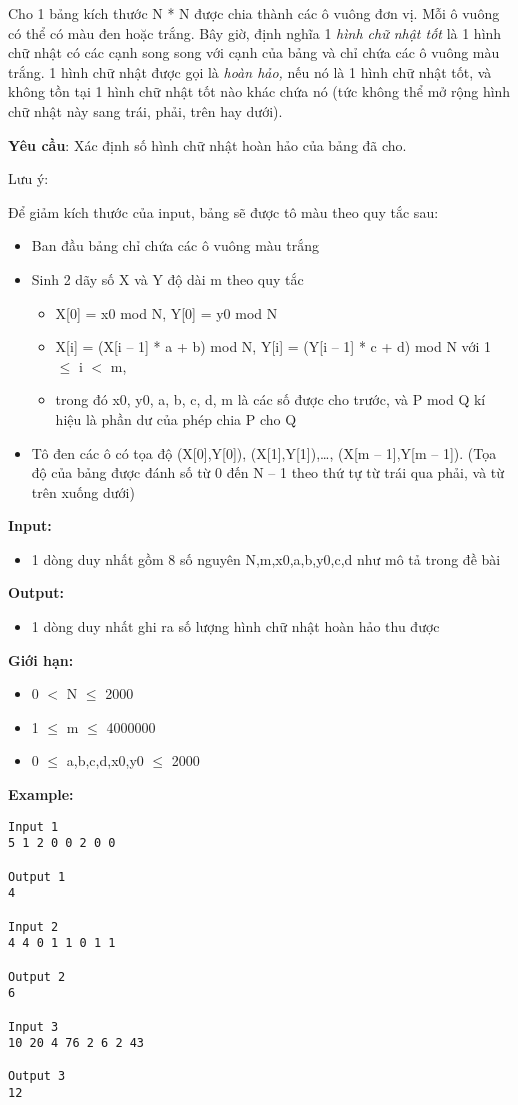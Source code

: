 

Cho 1 bảng kích thước N * N được chia thành các ô vuông đơn vị. Mỗi ô vuông có thể có màu đen hoặc trắng. Bây giờ, định nghĩa 1 \emph{ hình chữ nhật tốt } là 1 hình chữ nhật có các cạnh song song với cạnh của bảng và chỉ chứa các ô vuông màu trắng. 1 hình chữ nhật được gọi là \emph{ hoàn hảo, } nếu nó là 1 hình chữ nhật tốt, và không tồn tại 1 hình chữ nhật tốt nào khác chứa nó (tức không thể mở rộng hình chữ nhật này sang trái, phải, trên hay dưới).

\textbf{Yêu cầu}: Xác định số hình chữ nhật hoàn hảo của bảng đã cho.

Lưu ý:

Để giảm kích thước của input, bảng sẽ được tô màu theo quy tắc sau:
\begin{itemize}
	\item Ban đầu bảng chỉ chứa các ô vuông màu trắng
	\item Sinh 2 dãy số X và Y độ dài m theo quy tắc
\begin{itemize}
	\item X[0] = x0 mod N, Y[0] = y0 mod N
	\item X[i] = (X[i – 1] * a + b) mod N, Y[i] = (Y[i – 1] * c + d) mod N với 1  $\le$  i $<$ m,
	\item trong đó x0, y0, a, b, c, d, m là các số được cho trước, và P mod Q kí hiệu là phần dư của phép chia P cho Q
\end{itemize}
	\item Tô đen các ô có tọa độ (X[0],Y[0]), (X[1],Y[1]),…, (X[m – 1],Y[m – 1]). (Tọa độ của bảng được đánh số từ 0 đến N – 1 theo thứ tự từ trái qua phải, và từ trên xuống dưới)
\end{itemize}

\textbf{Input:}
\begin{itemize}
	\item 1 dòng duy nhất gồm 8 số nguyên N,m,x0,a,b,y0,c,d như mô tả trong đề bài
\end{itemize}

\textbf{Output:}
\begin{itemize}
	\item 1 dòng duy nhất ghi ra số lượng hình chữ nhật hoàn hảo thu được
\end{itemize}

\textbf{Giới hạn:}
\begin{itemize}
	\item 0 $<$ N  $\le$  2000
	\item 1  $\le$  m  $\le$  4000000
	\item 0  $\le$  a,b,c,d,x0,y0  $\le$  2000
\end{itemize}

\textbf{Example:}
\begin{verbatim}
Input 1
5 1 2 0 0 2 0 0

Output 1
4

Input 2
4 4 0 1 1 0 1 1

Output 2
6

Input 3
10 20 4 76 2 6 2 43

Output 3
12\end{verbatim}
